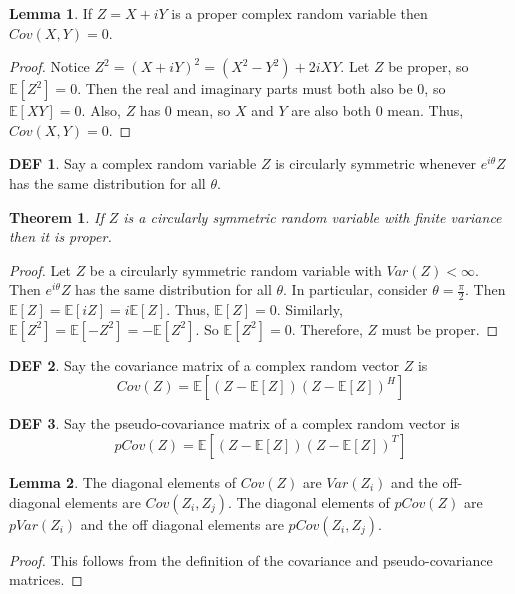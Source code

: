 \documentclass{article}
\newtheorem{theorem}{Theorem}
\theoremstyle{definition}\newtheorem{definition}{DEF}
\theoremstyle{lemma}\newtheorem{lemma}{Lemma}
\theoremstyle{corrolary}\newtheorem{corrolary}{Cor}
\begin{document}
\begin{lemma}
If $Z=X+iY$ is a proper complex random variable then $Cov(X,Y)=0$.
\end{lemma}
\begin{proof}
Notice $Z^2 = (X+iY)^2 = (X^2 - Y^2) + 2iXY$.
Let $Z$ be proper, so $\mathbb{E}[Z^2]=0$.
Then the real and imaginary parts must both also be 0, so $\mathbb{E}[XY]=0$.
Also, $Z$ has 0 mean, so $X$ and $Y$ are also both 0 mean.
Thus, $Cov(X,Y)=0$.
\end{proof}

\begin{definition}
Say a complex random variable $Z$ is circularly symmetric whenever $e^{i\theta}Z$ has the same distribution for all $\theta$.
\end{definition}

\begin{theorem}
If $Z$ is a circularly symmetric random variable with finite variance then it is proper.
\end{theorem}
\begin{proof}
Let $Z$ be a circularly symmetric random variable with $Var(Z)<\infty$.
Then $e^{i\theta}Z$ has the same distribution for all $\theta$.
In particular, consider $\theta=\frac{\pi}{2}$.
Then $\mathbb{E}[Z]=\mathbb{E}[iZ]=i\mathbb{E}[Z]$.
Thus, $\mathbb{E}[Z]=0$.
Similarly, $\mathbb{E}[Z^2]=\mathbb{E}[-Z^2]=-\mathbb{E}[Z^2]$.
So $\mathbb{E}[Z^2]=0$.
Therefore, $Z$ must be proper.
\end{proof}

\begin{definition}
Say the covariance matrix of a complex random vector $Z$ is
\begin{equation}
Cov(Z) = \mathbb{E}[(Z - \mathbb{E}[Z])(Z - \mathbb{E}[Z])^H]
\end{equation}
\end{definition}

\begin{definition}
Say the pseudo-covariance matrix of a complex random vector is
\begin{equation}
pCov(Z) = \mathbb{E}[(Z - \mathbb{E}[Z])(Z - \mathbb{E}[Z])^T]
\end{equation}
\end{definition}

\begin{lemma}
The diagonal elements of $Cov(Z)$ are $Var(Z_i)$ and the off-diagonal elements are $Cov(Z_i, Z_j)$.
The diagonal elements of $pCov(Z)$ are $pVar(Z_i)$ and the off diagonal elements are $pCov(Z_i, Z_j)$.
\end{lemma}
\begin{proof}
This follows from the definition of the covariance and pseudo-covariance matrices.
\end{proof}
\end{document}
